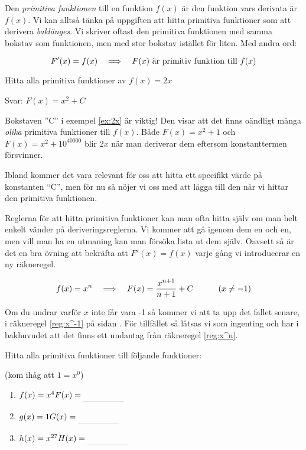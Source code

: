 \documentclass[a4paper, 12pt]{article}
\begin{document}
Den \emph{primitiva funktionen} till en funktion $f(x)$ är den funktion vars derivata är $f(x)$. Vi kan alltså tänka på uppgiften att hitta primitiva funktioner som att derivera \emph{baklänges}. Vi skriver oftast den primitiva funktionen med samma bokstav som funktionen, men med stor bokstav istället för liten. Med andra ord:

\[F'(x) = f(x) \hspace{1em} \Longrightarrow \hspace{1em} F(x) \textrm{ är primitiv funktion till } f(x)\]


\begin{exempel}
    \label{ex:2x}
    Hitta alla primitiva funktioner av $f(x) = 2x$

    Svar: $F(x) = x^2 + C$
\end{exempel}

Bokstaven ''C'' i exempel \ref{ex:2x} är viktig! Den visar att det finns oändligt många \emph{olika} primitiva funktioner till $f(x)$. Både $F(x) = x^2 + 1$ och $F(x) = x^2 + 10^{40000}$ blir $2x$ när man deriverar dem eftersom konstanttermen försvinner.

Ibland kommer det vara relevant för oss att hitta ett specifikt värde på konstanten ``C'', men för nu så nöjer vi oss med att lägga till den när vi hittar den primitiva funktionen.

Reglerna för att hitta primitiva funktioner kan man ofta hitta själv om man helt enkelt vänder på deriveringsreglerna. Vi kommer att gå igenom dem en och en, men vill man ha en utmaning kan man försöka lista ut dem själv. Oavsett så är det en bra övning att bekräfta att $F'(x) = f(x)$ varje gång vi introducerar en ny räkneregel.


\begin{regel}
    \label{reg:x^n}
    \[f(x) = x^n \hspace{1em} \Longrightarrow \hspace{1em} F(x) = \dfrac {x^{n+1}}{n+1} + C \hspace{3em} (x\neq -1)\]
\end{regel}

Om du undrar varför $x$ inte får vara -1 så kommer vi att ta upp det fallet senare, i räkneregel \ref{reg:x^-1} på sidan \pageref{reg:x^-1}. För tillfället så låtsas vi som ingenting och har i bakhuvudet att det finns ett undantag från räkneregel \ref{reg:x^n}.

\begin{uppgifter}
    \label{upp:x^n}
    Hitta alla primitiva funktioner till följande funktioner: 
    
    (kom ihåg att $1=x^0$)
    \begin{multicols}{3}
        \begin{enumerate}
            \item $f(x) = x^4 \\ F(x) \ans$
            \item $g(x) = 1 \\ G(x) \ans$
            \item $h(x) = x^{27} \\ H(x) \ans$
        \end{enumerate}
    \end{multicols}
\end{uppgifter}
\end{document}

